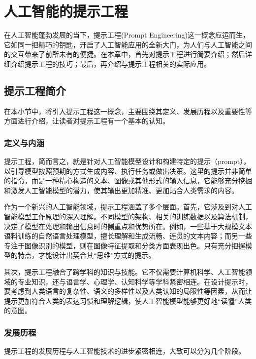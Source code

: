 \chapter{人工智能的提示工程}

在人工智能蓬勃发展的当下，提示工程(Prompt Engineering)这一概念应运而生，它如同一把精巧的钥匙，开启了人工智能应用的全新大门，为人们与人工智能之间的交互带来了前所未有的便捷。在本章中，首先对提示工程进行简要介绍；然后详细介绍提示工程的技巧；最后，再介绍与提示工程相关的实际应用。  

\section{提示工程简介}

在本小节中，将引入提示工程这一概念，主要围绕其定义、发展历程以及重要性等方面进行介绍，让读者对提示工程有一个基本的认知。

\subsection{定义与内涵}

提示工程，简而言之，就是针对人工智能模型设计和构建特定的提示（prompt），以引导模型按照预期的方式生成内容、执行任务或做出决策。这里的提示并非简单的指令，而是一种精心构造的文本、图像或其他形式的输入信息，它能够充分挖掘和激发人工智能模型的潜力，使其输出更加精准、更加贴合人类需求的内容。

作为一个新兴的人工智能领域，提示工程涵盖了多个层面。首先，它涉及到对人工智能模型工作原理的深入理解。不同模型的架构、相关的训练数据以及算法机制，决定了模型在处理和输出信息时的侧重点和优势所在。例如，一些基于大规模文本语料训练的自然语言处理模型，擅长理解和生成流畅、连贯的文本内容；而另一些专注于图像识别的模型，则在图像特征提取和分类方面表现出色。只有充分把握模型的特点，才能设计出契合其“思维”方式的提示。

其次，提示工程融合了跨学科的知识与技能。它不仅需要计算机科学、人工智能领域的专业知识，还与语言学、心理学、认知科学等学科紧密相连。在设计提示时，要考虑到人类语言的复杂性、语义的多样性以及人类认知的局限性等因素，从而让提示更加符合人类的表达习惯和理解逻辑，使人工智能模型能够更好地“读懂”人类的意图。

\subsection{发展历程}

提示工程的发展历程与人工智能技术的进步紧密相连，大致可以分为几个阶段。

